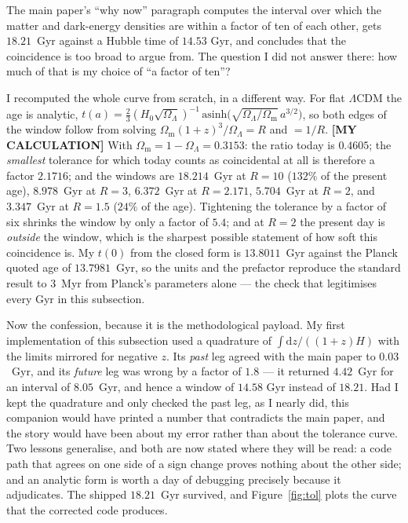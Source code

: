 \documentclass[11pt]{article}
\begin{document}
The main paper's ``why now'' paragraph computes the interval over which the matter and dark-energy
densities are within a factor of ten of each other, gets $18.21$~Gyr against a Hubble time of $14.53$
Gyr, and concludes that the coincidence is too broad to argue from. The question I did not answer
there: how much of that is my choice of ``a factor of ten''?

I recomputed the whole curve from scratch, in a different way. For flat $\Lambda$CDM the age is
analytic, $t(a) = \tfrac{2}{3}(H_0\sqrt{\Omega_\Lambda})^{-1}\,\mathrm{asinh}\big(\sqrt{\Omega_\Lambda
/\Omega_{\text{m}}}\,a^{3/2}\big)$, so both edges of the window follow from solving
$\Omega_{\text{m}}(1+z)^3/\Omega_\Lambda = R$ and $=1/R$. \textbf{[MY CALCULATION]} With $\Omega_{\text{m}} =
1-\Omega_\Lambda = 0.3153$: the ratio today is $0.4605$; the \emph{smallest} tolerance for which today
counts as coincidental at all is therefore a factor $2.1716$; and the windows are $18.214$~Gyr at
$R=10$ ($132\%$ of the present age), $8.978$~Gyr at $R=3$, $6.372$~Gyr at $R=2.171$, $5.704$~Gyr at
$R=2$, and $3.347$~Gyr at $R=1.5$ ($24\%$ of the age). Tightening the tolerance by a factor of six
shrinks the window by only a factor of $5.4$; and at $R=2$ the present day is \emph{outside} the
window, which is the sharpest possible statement of how soft this coincidence is. My $t(0)$ from the
closed form is $13.8011$~Gyr against the Planck quoted age of $13.7981$~Gyr, so the units and the
prefactor reproduce the standard result to $3$~Myr from Planck's parameters alone --- the check that
legitimises every Gyr in this subsection.

Now the confession, because it is the methodological payload. My first implementation of this
subsection used a quadrature of $\int \mathrm{d}z/((1+z)H)$ with the limits mirrored for negative $z$.
Its \emph{past} leg agreed with the main paper to $0.03$~Gyr, and its \emph{future} leg was wrong by a
factor of $1.8$ --- it returned $4.42$~Gyr for an interval of $8.05$~Gyr, and hence a window of $14.58$
Gyr instead of $18.21$. Had I kept the quadrature and only checked the past leg, as I nearly did, this
companion would have printed a number that contradicts the main paper, and the story would have been
about my error rather than about the tolerance curve. Two lessons generalise, and both are now stated
where they will be read: a code path that agrees on one side of a sign change proves nothing about the
other side; and an analytic form is worth a day of debugging precisely because it adjudicates. The
shipped $18.21$~Gyr survived, and Figure~\ref{fig:tol} plots the curve that the corrected code
produces.
\end{document}
